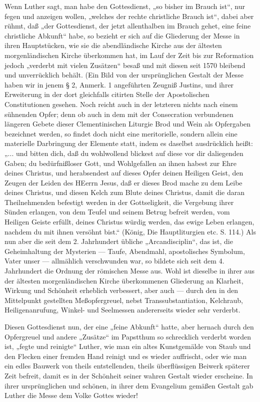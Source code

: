 Wenn Luther sagt, man habe den Gottesdienst, „so bisher im Brauch ist“, nur fegen und anzeigen wollen, „welches der rechte christliche Brauch ist“, dabei aber rühmt, daß „der Gottesdienst, der jetzt allenthalben im Brauch gehet, eine feine christliche Abkunft“ habe, so bezieht er sich auf die Gliederung der Messe in ihren Hauptstücken, wie sie die abendländische Kirche aus der ältesten morgenländischen Kirche überkommen hat, im Lauf der Zeit bis zur Reformation jedoch „verderbt mit vielen Zusätzen“ besaß und mit diesen seit 1570 bleibend und unverrücklich behält. (Ein Bild von der ursprünglichen Gestalt der Messe haben wir in jenem § 2, Anmerk. 1 angeführten Zeugniß Justins, und ihrer Erweiterung in der dort gleichfalls citirten Stelle der Apostolischen Constitutionen gesehen. Noch reicht auch in der letzteren nichts nach einem sühnenden Opfer; denn ob auch in dem mit der Consecration verbundenen längeren Gebete dieser Clementinischen Liturgie Brod und Wein als Opfergaben bezeichnet werden, so findet doch nicht eine meritorielle, sondern allein eine materielle Darbringung der Elemente statt, indem es daselbst ausdrücklich heißt: „... und bitten dich, daß du wohlwollend blickest auf diese vor dir daliegenden Gaben; du bedürfnißloser Gott, und Wohlgefallen an ihnen habest zur Ehre deines Christus, und herabsendest auf dieses Opfer deinen Heiligen Geist, den Zeugen der Leiden des HEerrn Jesus, daß er dieses Brod mache zu dem Leibe deines Christus, und diesen Kelch zum Blute deines Christus, damit die daran Theilnehmenden
befestigt werden in der Gottseligkeit, die Vergebung ihrer Sünden erlangen, von dem Teufel und seinem Betrug befreit werden, vom Heiligen Geiste erfüllt, deines Christus würdig werden, das ewige Leben erlangen, nachdem du mit ihnen versöhnt bist.“ (König, Die Hauptliturgien etc. S. 114.) Als nun aber die seit dem 2. Jahrhundert übliche „Arcandisciplin“, das ist, die Geheimhaltung der Mysterien — Taufe, Abendmahl, apostolisches Symbolum, Vater unser — allmählich verschwunden war, so bildete sich seit dem 4. Jahrhundert die Ordnung der römischen Messe aus. Wohl ist dieselbe in ihrer aus der ältesten morgenländischen Kirche überkommenen Gliederung an Klarheit, Wirkung und Schönheit erheblich verbessert, aber auch — durch den in den Mittelpunkt gestellten Meßopfergreuel, nebst Transsubstantiation, Kelchraub, Heiligenanrufung, Winkel- und Seelmessen andererseits wieder sehr verderbt.

Diesen Gottesdienst nun, der eine „feine Abkunft“ hatte, aber hernach durch den Opfergreuel und andere „Zusätze“ im Papstthum so schrecklich verderbt worden ist, „fegte und reinigte“ Luther, wie man ein altes Kunstgemälde von Staub und den Flecken einer fremden Hand reinigt und es wieder auffrischt, oder wie man ein edles Bauwerk von theils entstellenden, theils überflüssigen Beiwerk späterer Zeit befreit, damit es in der Schönheit seiner wahren Gestalt wieder erscheine. In ihrer ursprünglichen und schönen, in ihrer dem Evangelium gemäßen Gestalt gab Luther die Messe dem Volke Gottes wieder!

